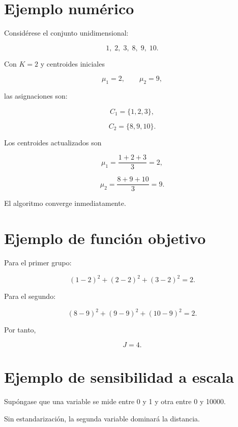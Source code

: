 \documentclass[
  spanish,
  10.5pt,
  letterpaper,
  DIV=11,
  numbers=noendperiod,
  oneside,
  open=any]{scrreprt}
\theoremstyle{definition}
\theoremstyle{definition}
\theoremstyle{plain}
\theoremstyle{remark}
\begin{document}
\section*{Ejemplo numérico}\label{ejemplo-numuxe9rico-1}


Considérese el conjunto unidimensional:

\[
1,\;2,\;3,\;8,\;9,\;10.
\]

Con \(K=2\) y centroides iniciales

\[
\mu_1=2,
\qquad
\mu_2=9,
\]

las asignaciones son:

\[
C_1=\{1,2,3\},
\]

\[
C_2=\{8,9,10\}.
\]

Los centroides actualizados son

\[
\mu_1
=
\frac{1+2+3}{3}
=
2,
\]

\[
\mu_2
=
\frac{8+9+10}{3}
=
9.
\]

El algoritmo converge inmediatamente.

\section*{Ejemplo de función
objetivo}\label{ejemplo-de-funciuxf3n-objetivo}


Para el primer grupo:

\[
(1-2)^2+(2-2)^2+(3-2)^2=2.
\]

Para el segundo:

\[
(8-9)^2+(9-9)^2+(10-9)^2=2.
\]

Por tanto,

\[
J=4.
\]

\section*{Ejemplo de sensibilidad a
escala}\label{ejemplo-de-sensibilidad-a-escala}


Supóngase que una variable se mide entre 0 y 1 y otra entre 0 y 10000.

Sin estandarización, la segunda variable dominará la distancia.
\end{document}
